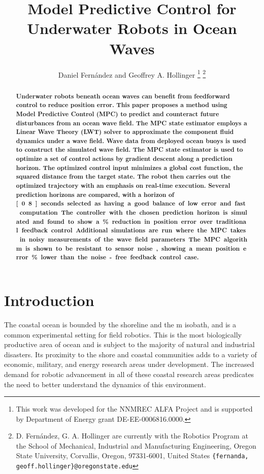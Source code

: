 \documentclass[letterpaper, 10 pt, conferences]{IEEEconf}  %
\title{\LARGE\bf Model Predictive Control for Underwater Robots in Ocean Waves}
\author{Daniel Fernández and Geoffrey A. Hollinger
\thanks{This work was developed for the NNMREC ALFA Project and is supported by Department of Energy grant DE-EE-0006816.0000.}
\thanks{D. Fernández, G. A. Hollinger are currently with the Robotics Program at the School of Mechanical, Industrial and Manufacturing Engineering, Oregon State University, Corvallis, Oregon, 97331-6001, United States {\tt\small\{fernanda, geoff.hollinger\}@oregonstate.edu} }
}
\begin{document}
\maketitle
\thispagestyle{empty}
\pagestyle{empty}

\begin{abstract}
\textbf{Underwater robots beneath ocean waves can benefit from feedforward control to reduce position error. This paper proposes a method using Model Predictive Control (MPC) to predict and counteract future disturbances from an ocean wave field. The MPC state estimator employs a Linear Wave Theory (LWT) solver to approximate the component fluid dynamics under a wave field. Wave data from deployed ocean buoys is used to construct the simulated wave field. The MPC state estimator is used to optimize a set of control actions by gradient descent along a prediction horizon. The optimized control input minimizes a global cost function, the squared distance from the target state. The robot then carries out the optimized trajectory with an emphasis on real-time execution. Several prediction horizons are compared, with a horizon of \unit[0.8]{seconds} selected as having a good balance of low error and fast computation. The controller with the chosen prediction horizon is simulated and found to show a \unit[74]{\%} reduction in position error over traditional feedback control. Additional simulations are run where the MPC takes in noisy measurements of the wave field parameters. The MPC algorithm is shown to be resistant to sensor noise, showing a mean position error \unit[44]{\%} lower than the noise-free feedback control case.}
\end{abstract}


\section{Introduction} 
\label{sec:introduction}

The coastal ocean is bounded by the shoreline and the \unit[200]{m} isobath, and is a common experimental setting for field robotics. This is the most biologically productive area of ocean \cite{phillips} and is subject to the majority of natural and industrial disasters. Its proximity to the shore and coastal communities adds to a variety of economic, military, and energy research areas under development. The increased demand for robotic advancement in all of these coastal research areas predicates the need to better understand the dynamics of this environment.
\end{document}
